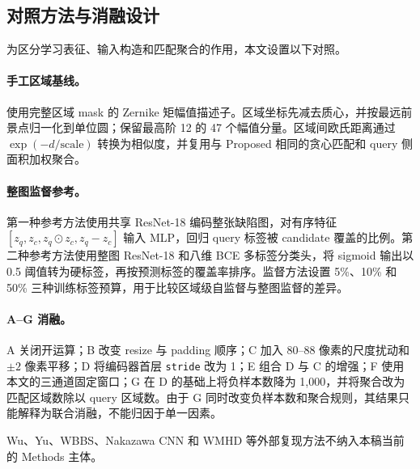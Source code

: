 \documentclass[UTF8,a4paper,11pt,fontset=fandol]{ctexart}
\begin{document}
\subsection{对照方法与消融设计}

为区分学习表征、输入构造和匹配聚合的作用，本文设置以下对照。

\paragraph{手工区域基线。}
使用完整区域 mask 的 Zernike 矩幅值描述子。区域坐标先减去质心，并按最远前景点归一化到单位圆；保留最高阶 12 的 47 个幅值分量。区域间欧氏距离通过
\(\exp(-d/\text{scale})\) 转换为相似度，并复用与 Proposed 相同的贪心匹配和 query 侧面积加权聚合。

\paragraph{整图监督参考。}
第一种参考方法使用共享 ResNet-18 编码整张缺陷图，对有序特征
\([z_q,z_c,z_q\odot z_c,z_q-z_c]\) 输入 MLP，回归 query 标签被 candidate 覆盖的比例。第二种参考方法使用整图 ResNet-18 和八维 BCE 多标签分类头，将 sigmoid 输出以 0.5 阈值转为硬标签，再按预测标签的覆盖率排序。监督方法设置 5\%、10\% 和 50\% 三种训练标签预算，用于比较区域级自监督与整图监督的差异。

\paragraph{A--G 消融。}
A 关闭开运算；B 改变 resize 与 padding 顺序；C 加入 80--88 像素的尺度扰动和 \(\pm 2\) 像素平移；D 将编码器首层 \texttt{stride} 改为 1；E 组合 D 与 C 的增强；F 使用本文的三通道固定窗口；G 在 D 的基础上将负样本数降为 1,000，并将聚合改为匹配区域数除以 query 区域数。由于 G 同时改变负样本数和聚合规则，其结果只能解释为联合消融，不能归因于单一因素。

Wu、Yu、WBBS、Nakazawa CNN 和 WMHD 等外部复现方法不纳入本稿当前的 Methods 主体。
\end{document}
